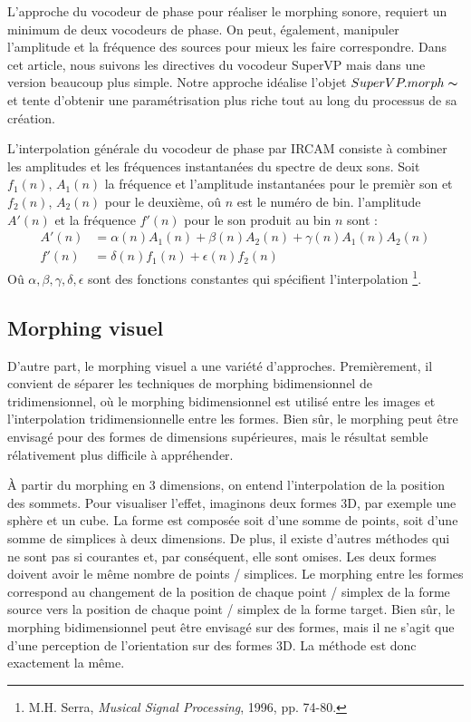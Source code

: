 L'approche du vocodeur de phase pour réaliser le morphing sonore, requiert un minimum de deux vocodeurs de phase. On peut, également, manipuler l'amplitude et la fréquence des sources pour mieux les faire correspondre. Dans cet article, nous suivons les directives du vocodeur SuperVP mais dans une version beaucoup plus simple. Notre approche idéalise l'objet $SuperVP.morph \thicksim $ et tente d'obtenir une paramétrisation plus riche tout au long du processus de sa création. 

L'interpolation générale du vocodeur de phase par IRCAM consiste à combiner les amplitudes et les fréquences instantanées du spectre de deux sons. Soit $f_1(n)$, $A_1(n)$ la fréquence et l'amplitude instantanées pour le premièr son et $f_2(n)$, $A_2(n)$ pour le deuxième, oû $n$ est le numéro de bin. l'amplitude $A'(n)$ et la fréquence $f'(n)$ pour le son produit au bin $n$ sont :
\begin{align*} 
	A'(n) &=  \alpha(n) A_1(n) + \beta(n) A_2(n) + \gamma(n) A_1(n) A_2(n) \\
	f'(n) &=  \delta(n) f_1(n) + \epsilon(n) f_2(n) 
\end{align*}
Oû $\alpha, \beta, \gamma, \delta, \epsilon$ sont des fonctions constantes qui spécifient l'interpolation \footnote{M.H. Serra, \textit{Musical Signal Processing}, 1996, pp. 74-80. \nocite{Roads97}}. 

    \subsection{Morphing visuel}
    
D'autre part, le morphing visuel a une variété d'approches. Premièrement, il convient de séparer les techniques de morphing bidimensionnel de tridimensionnel, où le morphing bidimensionnel est utilisé entre les images et l’interpolation tridimensionnelle entre les formes. Bien sûr, le morphing peut être envisagé pour des formes de dimensions supérieures, mais le résultat semble rélativement plus difficile à appréhender.

À partir du morphing en 3 dimensions, on entend l'interpolation de la position des sommets. Pour visualiser l'effet, imaginons deux formes 3D, par exemple une sphère et un cube. La forme est composée soit d'une somme de points, soit d'une somme de simplices à deux dimensions. De plus, il existe d'autres méthodes qui ne sont pas si courantes et, par conséquent, elle sont omises. Les deux formes doivent avoir le même nombre de points / simplices. Le morphing entre les formes correspond au changement de la position de chaque point / simplex de la forme source vers la position de chaque point / simplex de la forme target. Bien sûr, le morphing bidimensionnel peut être envisagé sur des formes, mais il ne s'agit que d'une perception de l'orientation sur des formes 3D. La méthode est donc exactement la même.


